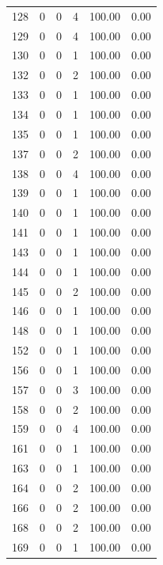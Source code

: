 \documentclass[11pt]{article}
\begin{document}
\begin{longtable}{r|r|r|r|r|r}
    128   & 0     & 0     & 4     & 100.00 & 0.00 \\
    129   & 0     & 0     & 4     & 100.00 & 0.00 \\
    130   & 0     & 0     & 1     & 100.00 & 0.00 \\
    132   & 0     & 0     & 2     & 100.00 & 0.00 \\
    133   & 0     & 0     & 1     & 100.00 & 0.00 \\
    134   & 0     & 0     & 1     & 100.00 & 0.00 \\
    135   & 0     & 0     & 1     & 100.00 & 0.00 \\
    137   & 0     & 0     & 2     & 100.00 & 0.00 \\
    138   & 0     & 0     & 4     & 100.00 & 0.00 \\
    139   & 0     & 0     & 1     & 100.00 & 0.00 \\
    140   & 0     & 0     & 1     & 100.00 & 0.00 \\
    141   & 0     & 0     & 1     & 100.00 & 0.00 \\
    143   & 0     & 0     & 1     & 100.00 & 0.00 \\
    144   & 0     & 0     & 1     & 100.00 & 0.00 \\
    145   & 0     & 0     & 2     & 100.00 & 0.00 \\
    146   & 0     & 0     & 1     & 100.00 & 0.00 \\
    148   & 0     & 0     & 1     & 100.00 & 0.00 \\
    152   & 0     & 0     & 1     & 100.00 & 0.00 \\
    156   & 0     & 0     & 1     & 100.00 & 0.00 \\
    157   & 0     & 0     & 3     & 100.00 & 0.00 \\
    158   & 0     & 0     & 2     & 100.00 & 0.00 \\
    159   & 0     & 0     & 4     & 100.00 & 0.00 \\
    161   & 0     & 0     & 1     & 100.00 & 0.00 \\
    163   & 0     & 0     & 1     & 100.00 & 0.00 \\
    164   & 0     & 0     & 2     & 100.00 & 0.00 \\
    166   & 0     & 0     & 2     & 100.00 & 0.00 \\
    168   & 0     & 0     & 2     & 100.00 & 0.00 \\
    169   & 0     & 0     & 1     & 100.00 & 0.00 \\

\end{longtable}
\end{document}
